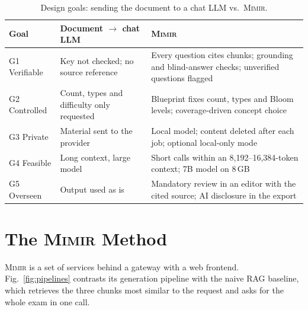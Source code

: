 \documentclass[conference]{IEEEtran}
\newcommand{\Mimir}{\textsc{Mimir}}
\begin{document}
\begin{table}[t]
\centering
\caption{Design goals: sending the document to a chat LLM vs.\ \Mimir{}.}
\label{tab:goals}
\footnotesize
\setlength{\tabcolsep}{3pt}
\begin{tabular}{@{}>{\raggedright\arraybackslash}p{1.45cm}>{\raggedright\arraybackslash}p{2.75cm}>{\raggedright\arraybackslash}p{3.7cm}@{}}
\toprule
Goal & Document $\to$ chat LLM & \Mimir{} \\
\midrule
G1 Verifiable & Key not checked; no source reference & Every question cites chunks; grounding and blind-answer checks; unverified questions flagged \\
G2 Controlled & Count, types and difficulty only requested & Blueprint fixes count, types and Bloom levels; coverage-driven concept choice \\
G3 Private & Material sent to the provider & Local model; content deleted after each job; optional local-only mode \\
G4 Feasible & Long context, large model & Short calls within an 8{,}192--16{,}384-token context; 7B model on 8\,GB \\
G5 Overseen & Output used as is & Mandatory review in an editor with the cited source; AI disclosure in the export \\
\bottomrule
\end{tabular}
\end{table}

\section{The \Mimir{} Method}
\label{sec:method}

\Mimir{} is a set of services behind a gateway with a web frontend. Fig.~\ref{fig:pipelines} contrasts
its generation pipeline with the naive RAG baseline, which retrieves the three chunks most similar to
the request and asks for the whole exam in one call.
\end{document}
